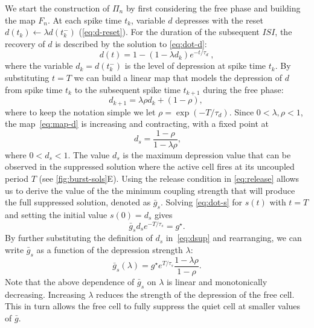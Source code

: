 \documentclass[utf8]{frontiersFPHY} %
\newcommand{\gbar}{\bar g}
\begin{document}
We start the construction of $\Pi_n$ by first considering the free phase and building the map $F_n$.
At each spike time $t_{k}$, variable $d$ depresses with the reset $d(t_{k})\leftarrow \lambda d(t_{k}^{-})$ (\cref{eq:d-reset}).
For the duration of the subsequent $ISI$, the recovery of $d$ is described by the solution to \cref{eq:dot-d}:
\begin{equation}
  d(t) = 1 - (1-\lambda d_{k})e^{-t/\tau_{d}}~\label{eq:d-sol},
\end{equation}
where the variable $d_{k}=d(t^{-}_{k})$ is the level of depression at spike time $t_{k}$.
By substituting $t=T$ we can build a linear map that models the depression of $d$ from spike time $t_{k}$ to the subsequent spike time $t_{k+1}$ during the free phase:
\begin{equation}
  d_{k+1} = \lambda\rho d_{k} + (1-\rho),~\label{eq:map-d}
\end{equation}
where to keep the notation simple we let $\rho=\exp(-T/\tau_{d})$.
Since $0<\lambda, \rho<1$, the map~\eqref{eq:map-d} is increasing and contracting, with a fixed point at
\begin{equation}
 ~\label{eq:dsup}
  d_{s}=\frac{1-\rho}{1-\lambda\rho},
\end{equation}
where $0<d_{s}<1$.
The value $d_{s}$ is the maximum depression value that can be observed in the suppressed solution where the active cell fires at its uncoupled period $T$ (see \cref{fig:burst-sols}E).
Using the release condition in \cref{eq:release} allows us to derive the value of the the minimum coupling strength that will produce the full suppressed solution, denoted as $\gbar_{s}$.
Solving \cref{eq:dot-s} for $s(t)$ with $t=T$ and setting the initial value $s(0)=d_{s}$ gives
\begin{equation}
\gbar_{s} d_{s}e^{-T/\tau_{s}}=g^{\star}.
\end{equation}
By further substituting the definition of $d_{s}$ in~\eqref{eq:dsup} and rearranging, we can write $\gbar_{s}$ as a function of the depression strength $\lambda$:
\begin{equation}
  \label{eq:gs}
  \gbar_{s}(\lambda) = g^{\star}e^{T/\tau_{s}}\frac{1-\lambda \rho}{1-\rho}.
\end{equation}
Note that the above dependence of $\gbar_{s}$ on $\lambda$ is linear and monotonically decreasing.
Increasing $\lambda$ reduces the strength of the depression of the free cell.
This in turn allows the free cell to fully suppress the quiet cell at smaller values of $\gbar$.
\end{document}
